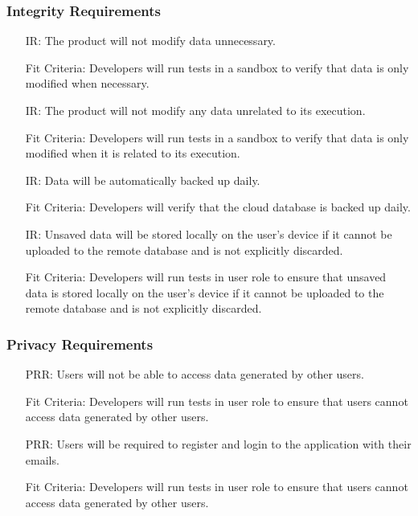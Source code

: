 \documentclass[12pt]{article}
\newcounter{reqnum} %
\newcounter{irreqnum} %
\newcounter{prrreqnum} %
\begin{document}
\subsubsection{Integrity Requirements}
\begin{itemize}
    \item[IR\refstepcounter{irreqnum}\theirreqnum \label{R_Inputs}:] The product will not modify data unnecessary.
    \item[] Fit Criteria: Developers will run tests in a sandbox to verify that data is only modified when necessary.
    \item[IR\refstepcounter{irreqnum}\theirreqnum \label{R_Inputs}:] The product will not modify any data unrelated to its execution.
    \item[] Fit Criteria: Developers will run tests in a sandbox to verify that data is only modified when it is related to its execution.
    \item[IR\refstepcounter{irreqnum}\theirreqnum \label{R_Inputs}:] Data will be automatically backed up daily.
     \item[] Fit Criteria: Developers will verify that the cloud database is backed up daily.
    \item[IR\refstepcounter{irreqnum}\theirreqnum \label{R_Inputs}:] Unsaved data will be stored locally on the user's device if it cannot be uploaded to the remote database and is not explicitly discarded.
    \item[] Fit Criteria: Developers will run tests in user role to ensure that unsaved data is stored locally on the user's device if it cannot be uploaded to the remote database and is not explicitly discarded.
\end{itemize}

\subsubsection{Privacy Requirements}
\begin{itemize}
    \item[PRR\refstepcounter{prrreqnum}\theprrreqnum \label{R_Inputs}:] Users will not be able to access data generated by other users.
    \item[] Fit Criteria: Developers will run tests in user role to ensure that users cannot access data generated by other users.
    \item[PRR\refstepcounter{prrreqnum}\theprrreqnum \label{R_Inputs}:] Users will be required to register and login to the application with their emails.
    \item[] Fit Criteria: Developers will run tests in user role to ensure that users cannot access data generated by other users.
\end{itemize}
\end{document}
